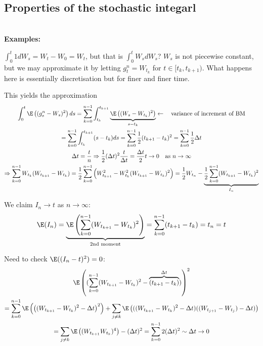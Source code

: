 \subsection{Properties of the stochastic integarl}\hfill\\
\noindent\textbf{Examples:}\par
\noindent $\int_{0}^{t}1dW_s = W_t-W_0=W_t$, but that is $\int_{0}^{t}W_sdW_s$? $W_s$ is not piecewise constant, but we may approximate it by letting $g_t^n = W_{t_k}$ for $t\in[t_k,t_{k+1})$. What happens here is essentially discretisation but for finer and finer time.\par
\noindent This yields the approximation
\begin{equation*}
  \begin{gathered}
    \int_{0}^{t}\E\left((g_s^n-W_s)^2\right)ds = \sum_{k=0}^{n-1}\int_{t_k}^{t_{k+1}}\underbrace{\E\left((W_s-W_{t_k})^2\right)}_{s-t_k}\leftarrow\quad\text{variance of increment of BM}\\
    = \sum_{k=0}^{n-1}\int_{t_k}^{t_{k+1}}(s-t_k)ds = \sum_{k=0}^{n-1}\dfrac{1}{2}(t_{k+1}-t_k)^2 = \sum_{k=0}^{n-1}\dfrac{1}{2}\Delta t\\
    \Delta t = \dfrac{t}{n}\Rightarrow \dfrac{1}{2}(\Delta t)^2\dfrac{t}{\Delta t} = \dfrac{\Delta t}{2}t \to0\quad\text{as } n\to\infty\\
    \Rightarrow \sum_{k=0}^{n-1}W_{t_k}(W_{t_{k+1}}-W_{t_k}) = \dfrac{1}{2}\sum_{k=0}^{n-1}\left(W_{t_{k+1}}^2-W_{t_k}^2(W_{t_{k+1}}-W_{t_k})^2\right) = \dfrac{1}{2}W_{t_n}-\underbrace{\dfrac{1}{2}\sum_{k=0}^{n-1}(W_{t_{k+1}}-W_{t_k})^2}_{I_n}
  \end{gathered}
\end{equation*}
\par\bigskip
\noindent We claim $I_n\to t$ as $n\to\infty$:
\begin{equation*}
  \begin{gathered}
    \E(I_n) = \underbrace{\E\left(\sum_{k=0}^{n-1}(W_{t_{k+1}}-W_{t_k})^2\right)}_{\text{2nd moment}} = \sum_{k=0}^{n-1}(t_{k+1}-t_k) = t_n = t
  \end{gathered}
\end{equation*}\par
\noindent Need to check $\E((I_n-t)^2) = 0$:
\begin{equation*}
  \begin{gathered}
    \E\left((\sum_{k=0}^{n-1}(W_{t_{k+1}}-W_{t_k})^2-\overbrace{(t_{k+1}-t_k)}^{\Delta t})\right)^2 \\
    = \sum_{k=0}^{n-1}\E\left(\left((W_{t_{k+1}}-W_{t_k})^2-\Delta t\right)^2\right) +\sum_{j\neq k}\E\left(((W_{t_{k+1}}-W_{t_k})^2-\Delta t)((W_{t_{j+1}}-W_{t_j})-\Delta t)\right)\\
    = \sum_{j\neq k}\E\left((W_{t_{k+1}}W_{t_k})^4\right)-(\Delta t)^2 = \sum_{k=0}^{n-1}2(\Delta t)^2\sim\Delta t \to0
  \end{gathered}
\end{equation*}\par
